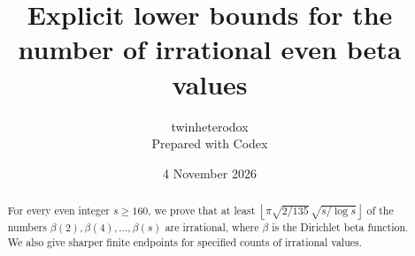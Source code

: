 \documentclass[11pt]{article}
\title{\Large Explicit lower bounds for the number of irrational even beta values}
\author{twinheterodox\\[2pt]\normalsize Prepared with Codex}
\date{4 November 2026}
\theoremstyle{remark}
\numberwithin{equation}{section}
\begin{document}
\maketitle
\begin{abstract}
For every even integer $s\ge160$, we prove that at least
\(\left\lfloor\pi\sqrt{2/135}\,\sqrt{s/\log s}\right\rfloor\)
of the numbers $\beta(2),\beta(4),\ldots,\beta(s)$ are irrational,
where $\beta$ is the Dirichlet beta function. We also give sharper
finite endpoints for specified counts of irrational values.
\end{abstract}









\appendix



\end{document}
